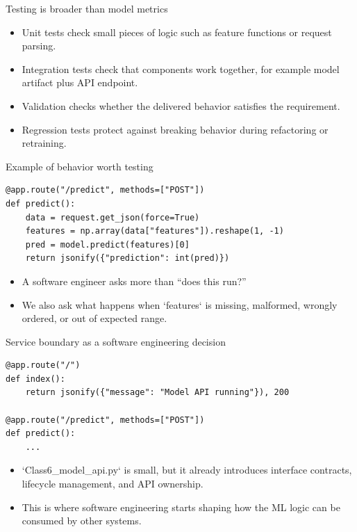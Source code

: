 \begin{frame}{Testing is broader than model metrics}
\begin{itemize}
\item Unit tests check small pieces of logic such as feature functions or request parsing.
\item Integration tests check that components work together, for example model artifact plus API endpoint.
\item Validation checks whether the delivered behavior satisfies the requirement.
\item Regression tests protect against breaking behavior during refactoring or retraining.
\end{itemize}
\coursefooter
\end{frame}

\begin{frame}[fragile]{Example of behavior worth testing}
\begin{lstlisting}[style=coursepython]
@app.route("/predict", methods=["POST"])
def predict():
    data = request.get_json(force=True)
    features = np.array(data["features"]).reshape(1, -1)
    pred = model.predict(features)[0]
    return jsonify({"prediction": int(pred)})
\end{lstlisting}
\begin{itemize}
\item A software engineer asks more than ``does this run?''
\item We also ask what happens when `features` is missing, malformed, wrongly ordered, or out of expected range.
\end{itemize}
\coursefooter
\end{frame}

\begin{frame}[fragile]{Service boundary as a software engineering decision}
\begin{lstlisting}[style=coursepython]
@app.route("/")
def index():
    return jsonify({"message": "Model API running"}), 200

@app.route("/predict", methods=["POST"])
def predict():
    ...
\end{lstlisting}
\begin{itemize}
\item `Class6_model_api.py` is small, but it already introduces interface contracts, lifecycle management, and API ownership.
\item This is where software engineering starts shaping how the ML logic can be consumed by other systems.
\end{itemize}
\coursefooter
\end{frame}

